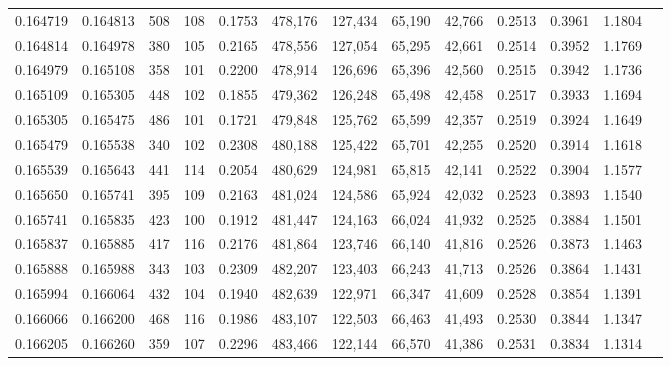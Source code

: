 \begin{tabular}{rrrrrrrrrrrrr}
0.164719 & 0.164813 &   508 & 108 &                                     0.1753 & 478,176 & 127,434 &  65,190 &  42,766 & 0.2513 & 0.3961 & 1.1804 \\
0.164814 & 0.164978 &   380 & 105 &                                     0.2165 & 478,556 & 127,054 &  65,295 &  42,661 & 0.2514 & 0.3952 & 1.1769 \\
0.164979 & 0.165108 &   358 & 101 &                                     0.2200 & 478,914 & 126,696 &  65,396 &  42,560 & 0.2515 & 0.3942 & 1.1736 \\
0.165109 & 0.165305 &   448 & 102 &                                     0.1855 & 479,362 & 126,248 &  65,498 &  42,458 & 0.2517 & 0.3933 & 1.1694 \\
0.165305 & 0.165475 &   486 & 101 &                                     0.1721 & 479,848 & 125,762 &  65,599 &  42,357 & 0.2519 & 0.3924 & 1.1649 \\
0.165479 & 0.165538 &   340 & 102 &                                     0.2308 & 480,188 & 125,422 &  65,701 &  42,255 & 0.2520 & 0.3914 & 1.1618 \\
0.165539 & 0.165643 &   441 & 114 &                                     0.2054 & 480,629 & 124,981 &  65,815 &  42,141 & 0.2522 & 0.3904 & 1.1577 \\
0.165650 & 0.165741 &   395 & 109 &                                     0.2163 & 481,024 & 124,586 &  65,924 &  42,032 & 0.2523 & 0.3893 & 1.1540 \\
0.165741 & 0.165835 &   423 & 100 &                                     0.1912 & 481,447 & 124,163 &  66,024 &  41,932 & 0.2525 & 0.3884 & 1.1501 \\
0.165837 & 0.165885 &   417 & 116 &                                     0.2176 & 481,864 & 123,746 &  66,140 &  41,816 & 0.2526 & 0.3873 & 1.1463 \\
0.165888 & 0.165988 &   343 & 103 &                                     0.2309 & 482,207 & 123,403 &  66,243 &  41,713 & 0.2526 & 0.3864 & 1.1431 \\
0.165994 & 0.166064 &   432 & 104 &                                     0.1940 & 482,639 & 122,971 &  66,347 &  41,609 & 0.2528 & 0.3854 & 1.1391 \\
0.166066 & 0.166200 &   468 & 116 &                                     0.1986 & 483,107 & 122,503 &  66,463 &  41,493 & 0.2530 & 0.3844 & 1.1347 \\
0.166205 & 0.166260 &   359 & 107 &                                     0.2296 & 483,466 & 122,144 &  66,570 &  41,386 & 0.2531 & 0.3834 & 1.1314 \\

\end{tabular}
